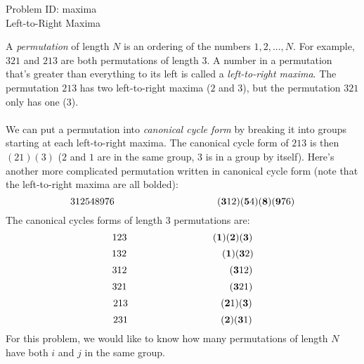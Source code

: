 \documentclass[a4paper,11pt]{article}
\begin{document}
\begin{center}
{\Huge Problem ID: maxima}\vspace{2 mm} \\	%
{\huge Left-to-Right Maxima}\vspace{2 mm} \\	%
\end{center}
\setcounter{page}{11}
\large{
A \emph{permutation} of length $N$ is an ordering of the numbers $1, 2, ..., N$. For example, $321$ and $213$ are both permutations of length $3$. A number in a permutation that's greater than everything to its left is called a \emph{left-to-right maxima}. The permutation $213$ has two left-to-right maxima ($2$ and $3$), but the permutation $321$ only has one ($3$).\\\\
We can put a permutation into \emph{canonical cycle form} by breaking it into groups starting at each left-to-right maxima. The canonical cycle form of $213$ is then $(21) (3)$ ($2$ and $1$ are in the same group, $3$ is in a group by itself). Here's another more complicated permutation written in canonical cycle form (note that the left-to-right maxima are all bolded):
$$312548976  \enspace\enspace\enspace\enspace\enspace\enspace\enspace\enspace\enspace\enspace\enspace\enspace\enspace\enspace\enspace\enspace\enspace\enspace\enspace\enspace\enspace ({\bf{3}}12)({\bf{5}}4)({\bf{8}})({\bf{9}}76)$$
The canonical cycles forms of length 3 permutations are:
$$123   \hspace{-6mm}\enspace\enspace\enspace\enspace\enspace\enspace\enspace\enspace\enspace\enspace\enspace\enspace\enspace\enspace\enspace\enspace\enspace\enspace\enspace\enspace\enspace ({\bf{1}})({\bf{2}})({\bf{3}})$$
$$132  \hspace{-1mm}\enspace\enspace\enspace\enspace\enspace\enspace\enspace\enspace\enspace\enspace\enspace\enspace\enspace\enspace\enspace\enspace\enspace\enspace\enspace\enspace ({\bf{1}})({\bf{3}}2)$$
$$312   \enspace\enspace\enspace\enspace\enspace\enspace\enspace\enspace\enspace\enspace\enspace\enspace\enspace\enspace\enspace\enspace\enspace\enspace\enspace\enspace\enspace ({\bf{3}}12)$$
$$321   \enspace\enspace\enspace\enspace\enspace\enspace\enspace\enspace\enspace\enspace\enspace\enspace\enspace\enspace\enspace\enspace\enspace\enspace\enspace\enspace\enspace ({\bf{3}}21)$$
$$213   \hspace{-3.5mm}\enspace\enspace\enspace\enspace\enspace\enspace\enspace\enspace\enspace\enspace\enspace\enspace\enspace\enspace\enspace\enspace\enspace\enspace\enspace\enspace\enspace ({\bf{2}}1)({\bf{3}})$$
$$231   \hspace{-3.5mm}\enspace\enspace\enspace\enspace\enspace\enspace\enspace\enspace\enspace\enspace\enspace\enspace\enspace\enspace\enspace\enspace\enspace\enspace\enspace\enspace\enspace ({\bf{2}})({\bf{3}}1)$$
For this problem, we would like to know how many permutations of length $N$ have both $i$ and $j$ in the same group.
}
\end{document}
